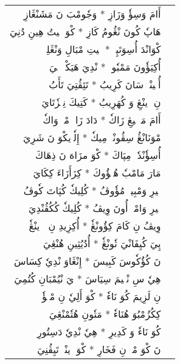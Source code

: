 \documentclass[a4paper, 12pt]{report}
\begin{document}
\begin{longtable}{rl}
\textarabic{أَامَ وَسِؤٗ وَزَازِ  *  وَجٗومْبَ نَ مَشَنْڠَازِ} & \\ 
\textarabic{هَاپٗ كُونَ نْڠُومُ كَازِ  *  كْوَ يٖيتُ هِينِ دُنِيَ} & \\ 
[8mm] 

\textarabic{كْوَانْدَ أُسِوَتَپِيٖ  *  كٖيتِ مْبَالِ وَنْڠَلِيٖ} & \\ 
\textarabic{أُكِيَؤٗونَ مَمْبٗويٖ  *  نْدِيَ هَيَكْوٖكٖلٖيَ} & \\ 
[8mm] 

\textarabic{أُسٖينْدٖ سَانَ كَرِيبُ  *  تَئِڤُتِيَ تَأَبُ} & \\ 
\textarabic{نِ وٖينْڠِ وَ كُهَرِيبُ  *  كَتِيكَ نِمٖزٗتَايَ} & \\ 
[8mm] 

\textarabic{أَامَ مَشٖمٖيڠِ زَاكٗ  *  دَادَ زَاكٖ مْكٖ وَاكٗ} & \\ 
\textarabic{مْوَنَانْڠُ سِڤُونْدٖ مِيكٗ  *  إِلٗوٖيكْوَ نَ شَرِيَ} & \\ 
[8mm] 

\textarabic{أُسِؤٗنْدٗوٖ مِپَاكَ  *  كْوَ مزَاهَ نَ ذِهَاكَ} & \\ 
\textarabic{مَارَ مَامْبٗ هُڠٖؤُوكَ  *  كِزَأَزَاءَ كِكَايَ} & \\ 
[8mm] 

\textarabic{خٖيرِ وَمْبِيوٖ مُؤٗوڤُ  *  كُلِيكٗ كُپَاتَ كٗوڤُ} & \\ 
\textarabic{خٖيرِ وَامْبٖ أُونَ وِيڤُ  *  كُلِيكٗ كُكُڤُنْدِيَ} & \\ 
[8mm] 

\textarabic{وِيڤُ نِ كَامَ كِؤُونْڠٗ  *  أُكِزِيدِ نِ تٖوٖينْڠٗ} & \\ 
\textarabic{پِيَ كُيِفَانْيَ تٗونْڠٗ  *  أُدُيُثِينِ هُنْڠِيَ} & \\ 
[8mm] 

\textarabic{نَ كُؤُكٗوسَ كَبِيسَ  *  إِنْڠَاوَ نْدِيٗ كِسَاسَ} & \\ 
\textarabic{هِيٗ سِ نْجٖيمَ سِيَاسَ  *  يَ نْيُمْبَانِ كُتُمِيَ} & \\ 
[8mm] 

\textarabic{نِ لَزِيمَ كُوَ نَاءٗ  *  كْوَ أَلِيٗ نِ مْكٖؤٗ} & \\ 
\textarabic{كِكُزُمْبُوَ هُنَاءٗ  *  مَتٗونِ هُتٗمْنْڠِيَ} & \\ 
[8mm] 

\textarabic{كُوَ نَاءٗ وَ كَدِيرِ  *  هِيٗ نْدِيٗ دَسِتُورِ} & \\ 
\textarabic{نَ كْوَ مْكٖ نِ فَخَارِ  *  كْوَ وٖينْدٖ تَيِڤُنِيَ} & \\ 
[8mm] 


\end{longtable}
\end{document}
